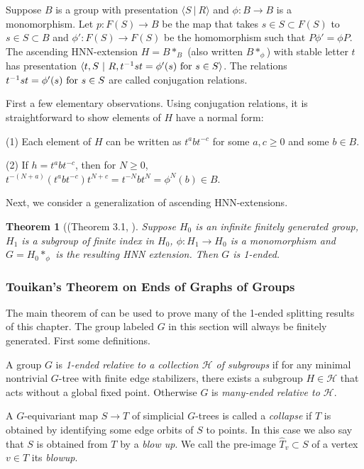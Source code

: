 \documentclass[12pt]{article}
\newtheorem{theorem}{Theorem}[subsection]
\begin{document}
Suppose $B$ is a group with presentation $\langle S  \ |\ R\rangle$ and $\phi:B\to B$ is a monomorphism. Let $p:F(S)\to B$ be the map that takes $s\in S\subset F(S)$ to $s\in S\subset B$ and $\phi' :F(S)\to F(S)$ be the homomorphism such that $P \phi'=\phi P$. The ascending HNN-extension $H=B\ast_B$ (also written $B\ast_\phi$) with stable letter $t$ has presentation $\langle t, S\ |\  R, t^{-1}st=\phi'(s) \hbox{ for } s\in S\rangle$. The relations $t^{-1}st=\phi'(s) \hbox{ for } s\in S$ are called conjugation relations. 

First a few elementary observations. Using conjugation relations, it is straightforward to show elements of $H$ have a normal form:

\noindent (1) Each element of $H$ can be written as $t^abt^{-c}$ for some $a,c\geq 0$ and some $b\in B$.

\noindent (2) If $h=t^abt^{-c}$, then for $N\geq 0$, $t^{-(N+a)}(t^abt^{-c}) t^{N+c}=t^{-N}bt^N=\phi^N(b)\in B$.

Next, we consider a generalization of ascending HNN-extensions. 
\begin{theorem} [(Theorem 3.1, \cite{Mih22}] \label{MMFIE}  
Suppose $H_0$ is an infinite finitely generated group, $H_1$ is a subgroup of finite index in $H_0$, $\phi:H_1\to H_0$ is a monomorphism and $G=H_0\ast_\phi$ is the resulting HNN extension. Then $G$ is 1-ended.
\end{theorem}

\subsubsection{Touikan's Theorem on Ends of Graphs of Groups} \label{Touik} 

The main theorem of \cite{Tou15} can be used to prove many of the 1-ended splitting results of this chapter.  The group labeled $G$ in this section will always be  finitely generated. First some definitions.

A group $G$ is {\it 1-ended relative to a collection $\mathcal H$ of subgroups} if for any minimal nontrivial $G$-tree with finite edge stabilizers, there exists a subgroup $H\in \mathcal H$ that acts without a global fixed point. Otherwise $G$ is {\it many-ended relative to $\mathcal H$}. 

A $G$-equivariant map $S\to T$ of simplicial $G$-trees is called a {\it collapse} if $T$ is obtained by identifying some edge orbits of $S$ to points. In this case we also say that $S$ is obtained from $T$ by a {\it blow up}. We call the pre-image $\hat T_v\subset S$ of a vertex $v\in T$ its {\it blowup}.
\end{document}

